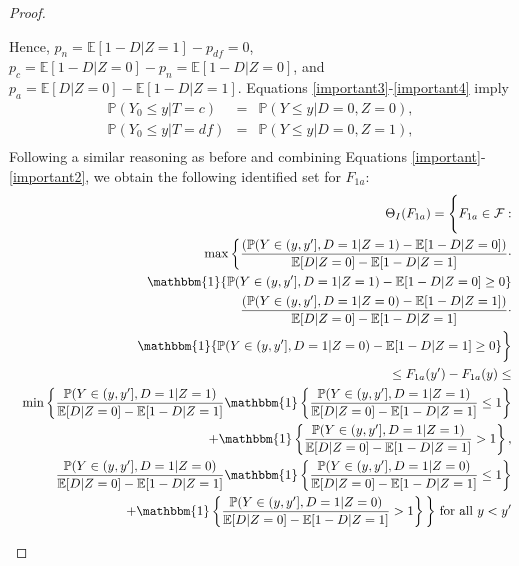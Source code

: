 \documentclass[12pt]{article}
\theoremstyle{plain}
\theoremstyle{definition}
\theoremstyle{remark}
\begin{document}
\begin{proof}
\begin{enumerate}
    Hence, $p_{n}=\mathbb E[1-D\vert Z=1]-p_{df}=0$, $p_c=\mathbb E[1-D\vert Z=0]-p_{n}=\mathbb E[1-D\vert Z=0]$, and $p_a=\mathbb E[D\vert Z=0]-\mathbb E[1-D\vert Z=1]$. Equations \eqref{important3}-\eqref{important4} imply
    \begin{eqnarray*}
        \mathbb P(Y_0 \leq y \vert T=c) &=& \mathbb P(Y \leq y \vert D=0, Z=0),\\
        \mathbb P(Y_0 \leq y \vert T=df) &=& \mathbb P(Y \leq y \vert D=0, Z=1),\\
    \end{eqnarray*}
Following a similar reasoning as before and combining Equations \eqref{important}-\eqref{important2}, we obtain the following identified set for $F_{1a}$:
\begin{eqnarray}
    && \Theta_I(F_{1a})=\Bigg\{
    F_{1a} \in \mathcal F: \nonumber\\
    &&\max\bigg\{ \frac{(\mathbb P(Y\in (y,y'], D=1 \vert Z=1)- \mathbb E[1-D\vert Z=0])}{\mathbb E[D\vert Z=0]-\mathbb E[1-D\vert Z=1]} \cdot \nonumber\\
    && \qquad \mathbbm{1}\{\mathbb P(Y\in (y,y'], D=1 \vert Z=1)- \mathbb E[1-D\vert Z=0]\geq 0\} \nonumber\\
   && \qquad \frac{(\mathbb P(Y\in (y,y'], D=1 \vert Z=0)- \mathbb E[1-D\vert Z=1])}{\mathbb E[D\vert Z=0]-\mathbb E[1-D\vert Z=1]} \cdot \nonumber \\
   && \qquad \mathbbm{1}\{\mathbb P(Y\in (y,y'], D=1 \vert Z=0)- \mathbb E[1-D\vert Z=1]\geq 0\} \bigg\} \nonumber \\
   && \qquad \leq F_{1a}(y')-F_{1a}(y) \leq \\
   && \min\bigg\{ \frac{\mathbb P(Y\in (y,y'], D=1 \vert Z=1)}{\mathbb E[D\vert Z=0]-\mathbb E[1-D\vert Z=1]}\mathbbm{1}\left\{\frac{\mathbb P(Y\in (y,y'], D=1 \vert Z=1)}{\mathbb E[D\vert Z=0]-\mathbb E[1-D\vert Z=1]} \leq 1\right\}\nonumber \\
   && \qquad \qquad +\mathbbm{1}\left\{\frac{\mathbb P(Y\in (y,y'], D=1 \vert Z=1)}{\mathbb E[D\vert Z=0]-\mathbb E[1-D\vert Z=1]} > 1\right\},\nonumber\\
   && \qquad \frac{\mathbb P(Y\in (y,y'], D=1 \vert Z=0)}{\mathbb E[D\vert Z=0]-\mathbb E[1-D\vert Z=1]}\mathbbm{1}\left\{\frac{\mathbb P(Y\in (y,y'], D=1 \vert Z=0)}{\mathbb E[D\vert Z=0]-\mathbb E[1-D\vert Z=1]} \leq 1\right\}\nonumber \\
   && \qquad \qquad +\mathbbm{1}\left\{\frac{\mathbb P(Y\in (y,y'], D=1 \vert Z=0)}{\mathbb E[D\vert Z=0]-\mathbb E[1-D\vert Z=1]} > 1\right\} \bigg\} \text{ for all } y<y'    

\end{eqnarray}
\end{enumerate}
\end{proof}
\end{document}
